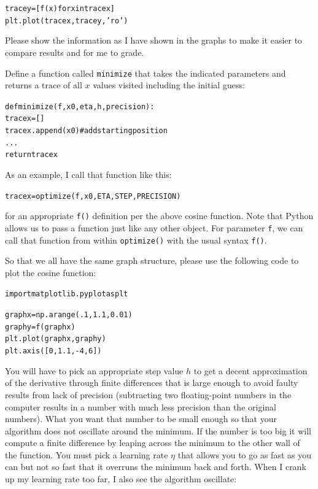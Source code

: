 \begin{fullwidth}
\begin{alltt}
tracey = [f(x) for x in tracex]
plt.plot(tracex, tracey, 'ro')
\end{alltt}

Please show the information as I have shown in the graphs to make it easier to compare results and for me to grade.

Define a function called {\tt minimize} that takes the indicated parameters and returns a trace of all $x$ values visited including the initial guess:

\begin{alltt}
def minimize(f, x0, eta, h, precision):
    tracex = []
    tracex.append(x0)  # add starting position
    ...
    return tracex
\end{alltt}

As an example, I call that function like this:

\begin{alltt}
tracex = optimize(f, x0, ETA, STEP, PRECISION)
\end{alltt}

\noindent for an appropriate {\tt f()} definition per the above cosine function.  Note that Python allows us to pass a function just like any other object.  For parameter {\tt f}, we can call that function from within {\tt optimize()} with the usual syntax {\tt f()}.

So that we all have the same graph structure, please use the following code to plot the cosine function:

\begin{alltt}
import matplotlib.pyplot as plt

graphx = np.arange(.1,1.1,0.01)
graphy = f(graphx)
plt.plot(graphx,graphy)
plt.axis([0,1.1,-4,6])
\end{alltt}

You will have to pick an appropriate step value $h$ to get a decent approximation of the derivative through finite differences that is large enough to avoid faulty results from lack of precision (subtracting two floating-point numbers in the computer results in a number with much less precision than the original numbers). What you want that number to be small enough so that your algorithm does not oscillate around the minimum. If the number is too big it will compute a finite difference by leaping across the minimum to the other wall of the function. You must pick a learning rate $\eta$ that allows you to go as fast as you can but not so fast that it overruns the minimum back and forth. When I crank up my learning rate too far, I also see the algorithm oscillate:


\end{fullwidth}
